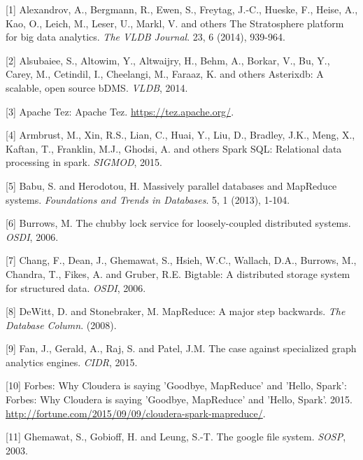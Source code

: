 \documentclass[b5paper,11pt,twoside,openright]{book}
\begin{document}
\leavevmode\hypertarget{ref-stratosphere}{}%
{[}1{]} Alexandrov, A., Bergmann, R., Ewen, S., Freytag, J.-C., Hueske,
F., Heise, A., Kao, O., Leich, M., Leser, U., Markl, V. and others The
Stratosphere platform for big data analytics. \emph{The VLDB Journal}.
23, 6 (2014), 939-964.

\leavevmode\hypertarget{ref-asterixdb}{}%
{[}2{]} Alsubaiee, S., Altowim, Y., Altwaijry, H., Behm, A., Borkar, V.,
Bu, Y., Carey, M., Cetindil, I., Cheelangi, M., Faraaz, K. and others
Asterixdb: A scalable, open source bDMS. \emph{VLDB}, 2014.

\leavevmode\hypertarget{ref-tez}{}%
{[}3{]} Apache Tez: Apache Tez. \url{https://tez.apache.org/}.

\leavevmode\hypertarget{ref-sparksql}{}%
{[}4{]} Armbrust, M., Xin, R.S., Lian, C., Huai, Y., Liu, D., Bradley,
J.K., Meng, X., Kaftan, T., Franklin, M.J., Ghodsi, A. and others Spark
SQL: Relational data processing in spark. \emph{SIGMOD}, 2015.

\leavevmode\hypertarget{ref-fnt-mr}{}%
{[}5{]} Babu, S. and Herodotou, H. Massively parallel databases and
MapReduce systems. \emph{Foundations and Trends in Databases}. 5, 1
(2013), 1-104.

\leavevmode\hypertarget{ref-chubby}{}%
{[}6{]} Burrows, M. The chubby lock service for loosely-coupled
distributed systems. \emph{OSDI}, 2006.

\leavevmode\hypertarget{ref-bigtable}{}%
{[}7{]} Chang, F., Dean, J., Ghemawat, S., Hsieh, W.C., Wallach, D.A.,
Burrows, M., Chandra, T., Fikes, A. and Gruber, R.E. Bigtable: A
distributed storage system for structured data. \emph{OSDI}, 2006.

\leavevmode\hypertarget{ref-mr-majorstep}{}%
{[}8{]} DeWitt, D. and Stonebraker, M. MapReduce: A major step
backwards. \emph{The Database Column}. (2008).

\leavevmode\hypertarget{ref-grail}{}%
{[}9{]} Fan, J., Gerald, A., Raj, S. and Patel, J.M. The case against
specialized graph analytics engines. \emph{CIDR}, 2015.

\leavevmode\hypertarget{ref-cloudera-spark}{}%
{[}10{]} Forbes: Why Cloudera is saying 'Goodbye, MapReduce' and 'Hello,
Spark': Forbes: Why Cloudera is saying 'Goodbye, MapReduce' and 'Hello,
Spark'. 2015.
\url{http://fortune.com/2015/09/09/cloudera-spark-mapreduce/}.

\leavevmode\hypertarget{ref-gfs}{}%
{[}11{]} Ghemawat, S., Gobioff, H. and Leung, S.-T. The google file
system. \emph{SOSP}, 2003.
\end{document}
